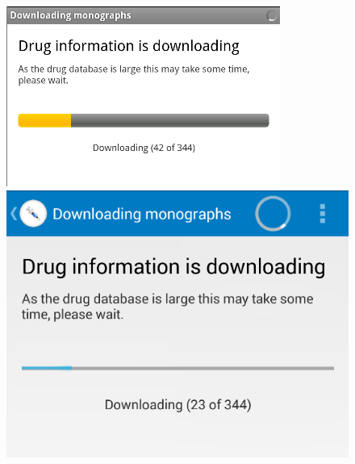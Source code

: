 \begin{figure}[H]
\centering
\begin{minipage}{.5\textwidth}
  \centering
  \includegraphics[width=.8\linewidth]{Images/screenshots/API10/download.png}
\end{minipage}%
\begin{minipage}{.5\textwidth}
  \centering
  \includegraphics[width=.8\linewidth]{Images/screenshots/API18/download.png}
\end{minipage}
\end{figure}


